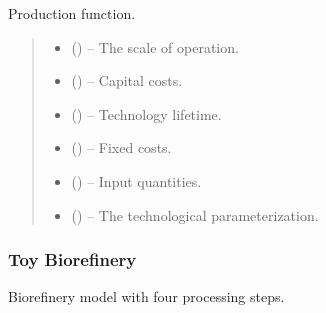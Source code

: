 \documentclass[letterpaper,10pt,english]{sphinxmanual}
\begin{document}
\begin{fulllineitems}
\label{\detokenize{technology:technology.simple_electrolysis.production}}
\pysigstartsignatures
{}
\pysigstopsignatures
\sphinxAtStartPar
Production function.
\begin{quote}\begin{description}
\begin{itemize}
\item {} 
\sphinxAtStartPar
{} () – The scale of operation.

\item {} 
\sphinxAtStartPar
{} () – Capital costs.

\item {} 
\sphinxAtStartPar
{} () – Technology lifetime.

\item {} 
\sphinxAtStartPar
{} () – Fixed costs.

\item {} 
\sphinxAtStartPar
{} () – Input quantities.

\item {} 
\sphinxAtStartPar
{} () – The technological parameterization.

\end{itemize}

\end{description}\end{quote}

\end{fulllineitems}



\subsubsection{Toy Biorefinery}
\label{\detokenize{technology:module-technology.tutorial_biorefinery}}\label{\detokenize{technology:toy-biorefinery}}
\sphinxAtStartPar
Biorefinery model with four processing steps.
\end{document}
